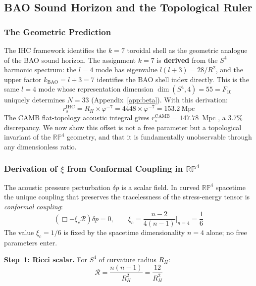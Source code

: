 \documentclass[12pt,a4paper]{article}
\begin{document}
\subsection{BAO Sound Horizon and the Topological Ruler}
\label{sec:bao_pred}

\subsubsection{The Geometric Prediction}

The IHC framework identifies the $k = 7$ toroidal shell as the geometric analogue
of the BAO sound horizon. The assignment $k = 7$ is \textbf{derived} from the
$S^4$ harmonic spectrum: the $l=4$ mode has eigenvalue $l(l+3) = 28/R^2$, and
the upper factor $k_\mathrm{BAO} = l+3 = 7$ identifies the BAO shell index directly.
This is the same $l=4$ mode whose representation dimension $\dim(S^4,4)=55=F_{10}$
uniquely determines $N=33$ (Appendix~\ref{app:beta}). With this derivation:
\begin{equation}
  r_s^\mathrm{IHC} = R_H \times \varphi^{-7} = 4448 \times \varphi^{-7} = 153.2~\mathrm{Mpc}
\end{equation}
The CAMB flat-topology acoustic integral gives $r_s^\mathrm{CAMB} = 147.78$~Mpc
\citep{Planck2020}, a 3.7\% discrepancy. We now show this offset is not a free
parameter but a topological invariant of the $\mathbb{RP}^4$ geometry, and that
it is fundamentally unobservable through any dimensionless ratio.

\subsubsection{Derivation of $\xi$ from Conformal Coupling in $\mathbb{RP}^4$}
\label{sec:xi_derivation}

The acoustic pressure perturbation $\delta p$ is a scalar field. In curved
$\mathbb{RP}^4$ spacetime the unique coupling that preserves the tracelessness of
the stress-energy tensor is \emph{conformal coupling}:
\begin{equation}
  \left(\Box - \xi_c \mathcal{R}\right)\delta p = 0, \qquad
  \xi_c = \frac{n-2}{4(n-1)}\bigg|_{n=4} = \frac{1}{6}
  \label{eq:conformal_wave}
\end{equation}
The value $\xi_c = 1/6$ is fixed by the spacetime dimensionality $n = 4$ alone;
no free parameters enter.

\textbf{Step~1: Ricci scalar.} For $S^4$ of curvature radius $R_H$:
\begin{equation}
  \mathcal{R} = \frac{n(n-1)}{R_H^2} = \frac{12}{R_H^2}
\end{equation}
\end{document}
